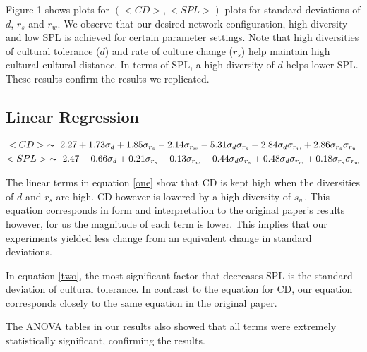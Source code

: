 Figure 1 shows plots for $(<CD>, <SPL>)$ plots for standard deviations of
$d$, $r_s$ and $r_w$.
We observe that our desired network configuration, high diversity and
low SPL is achieved for certain parameter settings.
Note that high diversities of cultural tolerance ($d$) and rate of
culture change ($r_s$) help maintain high cultural cultural distance.
In terms of SPL, a high diversity of $d$ helps lower SPL.
These results confirm the results we replicated.



\subsection{Linear Regression}
\begin{gather}
    <CD> ~ \thicksim ~ 2.27 + 1.73\sigma_d + 1.85\sigma_{r_s} - 2.14\sigma_{r_w} -
                5.31\sigma_{d}\sigma_{r_s} + 2.84\sigma_{d}\sigma_{r_w} + 2.86\sigma_{r_s}\sigma_{r_w} \label{one}\\
    <SPL> ~ \thicksim ~ 2.47 - 0.66\sigma_d + 0.21\sigma_{r_s} - 0.13 \sigma_{r_w} -
                0.44\sigma_{d}\sigma_{r_s} + 0.48\sigma_{d}\sigma_{r_w} + 0.18\sigma_{r_s}\sigma_{r_w} \label{two}
\end{gather}

The linear terms in equation \eqref{one} show that CD is kept high
when the diversities of $d$ and $r_s$ are high.
CD however is lowered
by a high diversity of $s_w$.
This equation corresponds in form and interpretation to the original paper's
results however, for us the magnitude of each term is lower.
This implies that our experiments yielded less change from an equivalent change
in standard deviations.

In equation \eqref{two}, the most significant factor that decreases SPL is
the standard deviation of cultural tolerance.
In contrast to the equation for CD, our equation corresponds closely to the
same equation in the original paper.

The ANOVA tables in our results also showed that all terms were
extremely statistically significant, confirming the results.